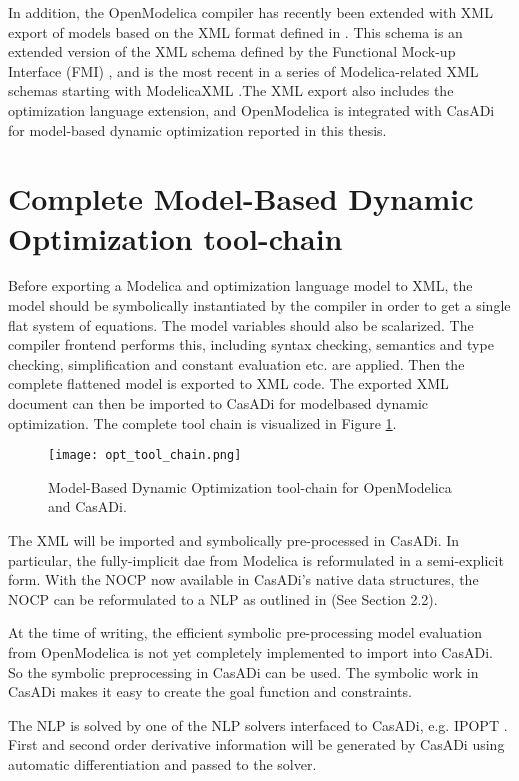 In addition, the OpenModelica compiler has recently been extended with XML export of models \cite{alachew} based on the XML
format defined in \cite{xml}. This schema is an extended version of the XML schema
defined by the Functional Mock-up Interface (FMI) \cite{fmi}, and is the most recent in a series of
Modelica-related XML schemas starting with ModelicaXML \cite{pop}.The XML export also includes the
optimization language extension, and OpenModelica is integrated with CasADi for model-based dynamic optimization reported in this thesis.

\section{Complete Model-Based Dynamic Optimization tool-chain}
\label{sec:optimizationtoolchain}

Before exporting a Modelica and optimization language model to XML, the model should be symbolically
instantiated by the compiler in order to get a single flat system of equations. The model variables should also be
scalarized. The compiler frontend performs this, including syntax checking, semantics and type checking, simplification
and constant evaluation etc. are applied. Then the complete flattened model is exported to XML code. The exported
XML document can then be imported to CasADi for modelbased dynamic optimization. The complete tool chain is
visualized in Figure \ref{fig:optimizationtoolchain}.

\begin{figure}
	\texttt{[image: opt\_tool\_chain.png]}
	\caption{Model-Based Dynamic Optimization tool-chain for OpenModelica and CasADi.}
	\label{fig:optimizationtoolchain}
\end{figure}

The XML will be imported and symbolically pre-processed in CasADi. In particular, the fully-implicit \acrshort{dae} from
Modelica is reformulated in a semi-explicit form. With the NOCP now available in CasADi’s native data structures, the
NOCP can be reformulated to a NLP as outlined in \cite{alachewoptimization} (See Section 2.2).

At the time of writing, the efficient symbolic pre-processing model evaluation from OpenModelica is not yet completely
implemented to import into CasADi. So the symbolic preprocessing in CasADi can be used. The symbolic work in CasADi makes it easy to create the goal function and constraints.

The NLP is solved by one of the NLP solvers interfaced to CasADi, e.g. IPOPT \cite{wachter}. First and second order derivative information will be generated by CasADi using automatic differentiation and passed to the solver.


